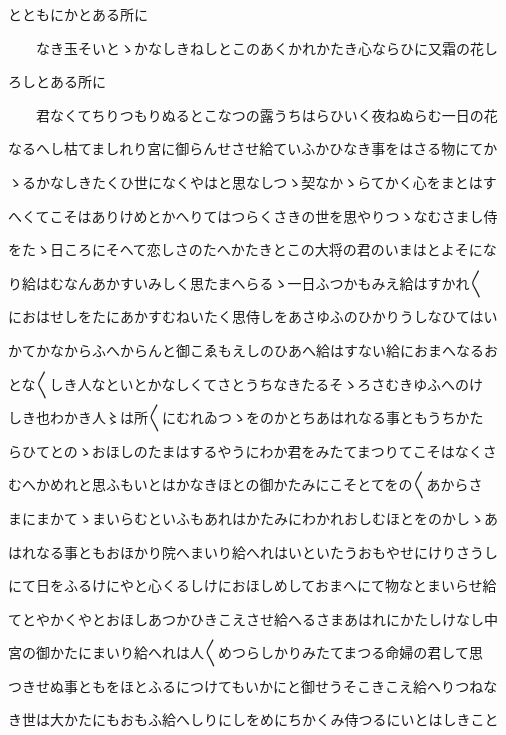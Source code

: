 \documentclass[a4paper,11pt,landscape]{ltjtarticle}
\begin{document}
とともにかとある所に
\par\medskip
　　なき玉そいとゝかなしきねしとこのあくかれかたき心ならひに又霜の花し
\par\medskip
ろしとある所に
\par\medskip
　　君なくてちりつもりぬるとこなつの露うちはらひいく夜ねぬらむ一日の花
\par\medskip
なるへし枯てましれり宮に御らんせさせ給ていふかひなき事をはさる物にてか
\par\medskip
ゝるかなしきたくひ世になくやはと思なしつゝ契なかゝらてかく心をまとはす
\par\medskip
へくてこそはありけめとかへりてはつらくさきの世を思やりつゝなむさまし侍
\par\medskip
をたゝ日ころにそへて恋しさのたへかたきとこの大将の君のいまはとよそにな
\par\medskip
り給はむなんあかすいみしく思たまへらるゝ一日ふつかもみえ給はすかれ〱
\par\medskip
におはせしをたにあかすむねいたく思侍しをあさゆふのひかりうしなひてはい
\par\medskip
かてかなからふへからんと御こゑもえしのひあへ給はすない給におまへなるお
\par\medskip
とな〱しき人なといとかなしくてさとうちなきたるそゝろさむきゆふへのけ
\par\medskip
しき也わかき人〻は所〱にむれゐつゝをのかとちあはれなる事ともうちかた
\par\medskip
らひてとのゝおほしのたまはするやうにわか君をみたてまつりてこそはなくさ
\par\medskip
むへかめれと思ふもいとはかなきほとの御かたみにこそとてをの〱あからさ
\par\medskip
まにまかてゝまいらむといふもあれはかたみにわかれおしむほとをのかしゝあ
\par\medskip
はれなる事ともおほかり院へまいり給へれはいといたうおもやせにけりさうし
\par\medskip
にて日をふるけにやと心くるしけにおほしめしておまへにて物なとまいらせ給
\par\medskip
てとやかくやとおほしあつかひきこえさせ給へるさまあはれにかたしけなし中
\par\medskip
宮の御かたにまいり給へれは人〱めつらしかりみたてまつる命婦の君して思
\par\medskip
つきせぬ事ともをほとふるにつけてもいかにと御せうそこきこえ給へりつねな
\par\medskip
き世は大かたにもおもふ給へしりにしをめにちかくみ侍つるにいとはしきこと
\par\medskip
\end{document}
